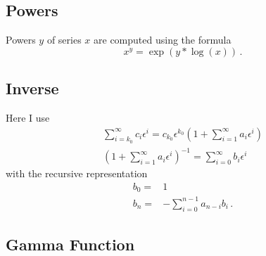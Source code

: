 \documentclass[titlepage]{article}
\begin{document}
\subsection{Powers}
\label{sec:impl_pow}

Powers $y$ of series $x$ are computed using the formula
\begin{equation}
  \label{eq:pow}
  x^y=\exp(y*\log(x))\,.
\end{equation}


\subsection{Inverse}
\label{sec:impl_inverse}

Here I use
\begin{align}
  \label{eq:inv}
  \sum_{i=k_0}^{\infty}c_i
    \epsilon^i=c_{k_0}\epsilon^{k_0}\left(1+\sum_{i=1}^{\infty}a_i
    \epsilon^i\right)\\
\left(1+\sum_{i=1}^{\infty}a_i \epsilon^i\right)^{-1}=\sum_{i=0}^{\infty}b_i \epsilon^i
\end{align}
with the recursive representation
\begin{align}
  \label{eq:inv_rec}
  b_0=&1\\
  b_n=&-\sum_{i=0}^{n-1} a_{n-i}b_i \,.
\end{align}

\subsection{Gamma Function}
\label{sec:impl_gamma}
\end{document}
